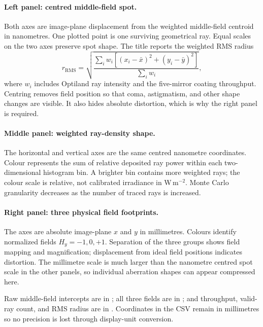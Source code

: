 \documentclass[11pt,a4paper]{article}
\begin{document}
\paragraph{Left panel: centred middle-field spot.}
Both axes are image-plane displacement from the weighted middle-field centroid
in nanometres.  One plotted point is one surviving geometrical ray.  Equal
scales on the two axes preserve spot shape.  The title reports the weighted
RMS radius
\begin{equation}
 r_{\mathrm{RMS}}=
 \sqrt{\frac{\sum_i w_i[(x_i-\bar x)^2+(y_i-\bar y)^2]}{\sum_i w_i}},
\end{equation}
where $w_i$ includes Optiland ray intensity and the five-mirror coating
throughput.  Centring removes field position so that coma, astigmatism, and
other shape changes are visible.  It also hides absolute distortion, which is
why the right panel is required.

\paragraph{Middle panel: weighted ray-density shape.}
The horizontal and vertical axes are the same centred nanometre coordinates.
Colour represents the sum of relative deposited ray power within each
two-dimensional histogram bin.  A brighter bin contains more weighted rays;
the colour scale is relative, not calibrated irradiance in
W\,m$^{-2}$.  Monte Carlo granularity decreases as the number of traced rays is
increased.

\paragraph{Right panel: three physical field footprints.}
The axes are absolute image-plane $x$ and $y$ in millimetres.  Colours identify
normalized fields $H_y=-1,0,+1$.  Separation of the three groups shows field
mapping and magnification; displacement from ideal field positions indicates
distortion.  The millimetre scale is much larger than the nanometre centred
spot scale in the other panels, so individual aberration shapes can appear
compressed here.

Raw middle-field intercepts are in
; all three fields are in
; and throughput, valid-ray count, and
RMS radius are in .  Coordinates in the CSV
remain in millimetres so no precision is lost through display-unit conversion.
\end{document}
